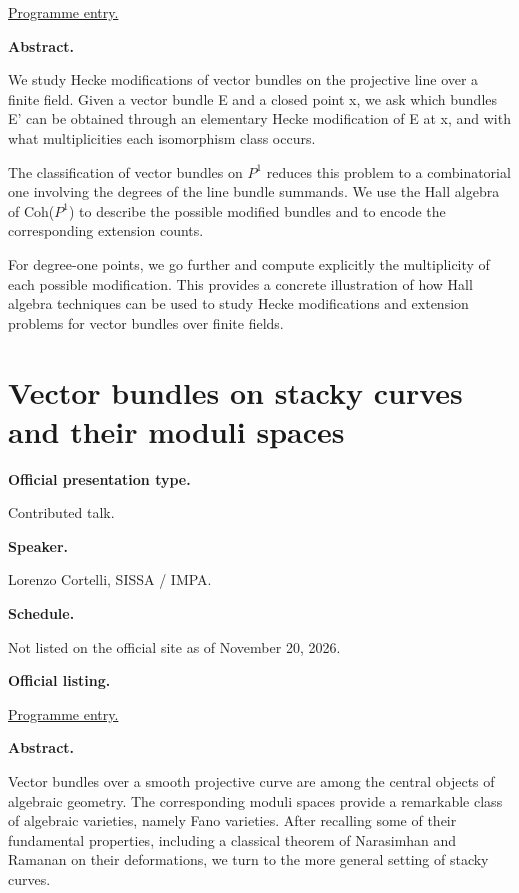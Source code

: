 \href{%
https://sites.google.com/view/%
geoalgcompluff/legal/%
legal-2027-resumos#h.dant8g3oe5ea%
}{Programme entry.}

\medskip\noindent
{\bf Abstract.}

We study Hecke modifications of vector
bundles on the projective line over a finite
field. Given a vector bundle E and a closed
point x, we ask which bundles E' can be
obtained through an elementary Hecke
modification of E at x, and with what
multiplicities each isomorphism class occurs.

The classification of vector bundles on $P^1$
reduces this problem to a combinatorial one
involving the degrees of the line bundle
summands. We use the Hall algebra of
Coh($P^1$) to describe the possible modified
bundles and to encode the corresponding
extension counts.

For degree-one points, we go further and
compute explicitly the multiplicity of each
possible modification. This provides a
concrete illustration of how Hall algebra
techniques can be used to study Hecke
modifications and extension problems for
vector bundles over finite fields.

\section{Vector bundles on stacky curves and
their moduli spaces}
\label{section-vector-bundles-on-stacky}

\medskip\noindent
{\bf Official presentation type.}

Contributed talk.

\medskip\noindent
{\bf Speaker.}

Lorenzo Cortelli, SISSA / IMPA.

\medskip\noindent
{\bf Schedule.}

Not listed on the official site as of
November 20, 2026.

\medskip\noindent
{\bf Official listing.}

\href{%
https://sites.google.com/view/%
geoalgcompluff/legal/%
legal-2027-resumos#h.dant8g3oe5ea%
}{Programme entry.}

\medskip\noindent
{\bf Abstract.}

Vector bundles over a smooth projective curve
are among the central objects of algebraic
geometry. The corresponding moduli spaces
provide a remarkable class of algebraic
varieties, namely Fano varieties. After
recalling some of their fundamental
properties, including a classical theorem of
Narasimhan and Ramanan on their deformations,
we turn to the more general setting of stacky
curves.

